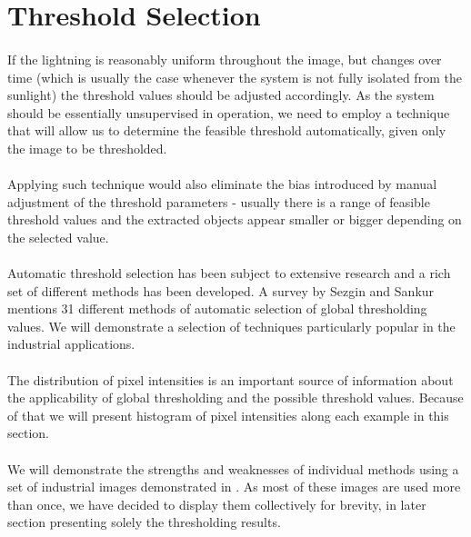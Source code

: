 \section{Threshold Selection}

\paragraph*{}
If the lightning is reasonably uniform throughout the image, but changes over time (which is usually the case whenever the system is not fully isolated from the sunlight) the threshold values should be adjusted accordingly. As the system should be essentially unsupervised in operation, we need to employ a technique that will allow us to determine the feasible threshold automatically, given only the image to be thresholded.

\paragraph*{}
Applying such technique would also eliminate the bias introduced by manual adjustment of the threshold parameters - usually there is a range of feasible threshold values and the extracted objects appear smaller or bigger depending on the selected value.

\paragraph*{}
Automatic threshold selection has been subject to extensive research and a rich set of different methods has been developed. A survey\cite{SezginSankur04} by Sezgin and Sankur mentions 31 different methods of automatic selection of global thresholding values. We will demonstrate a selection of techniques particularly popular in the industrial applications.

\paragraph*{}
The distribution of pixel intensities is an important source of information about the applicability of global thresholding and the possible threshold values. Because of that we will present histogram of pixel intensities along each example in this section.

\paragraph*{}
We will demonstrate the strengths and weaknesses of individual methods using a set of industrial images demonstrated in . As most of these images are used more than once, we have decided to display them collectively for brevity, in later section presenting solely the thresholding results.


